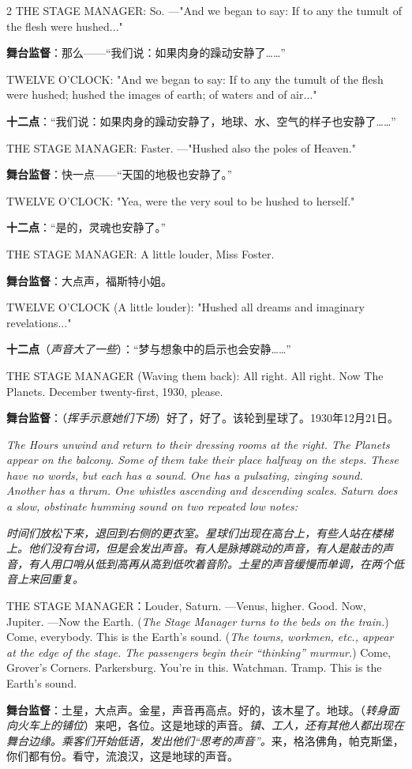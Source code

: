 \documentclass[lang=cn,newtx,10pt,scheme=chinese]{elegantbook}
\newcommand{\pair}[2]{%
\switchcolumn* #2\par
\switchcolumn  #1\par
}
\begin{document}
\begin{paracol}{2}
\pair{
    \textbf{舞台监督}：那么——“我们说：如果肉身的躁动安静了……”
}{
    THE STAGE MANAGER: So. —"And we began to say: If to any the tumult of the flesh were hushed..."
}

\pair{
    \textbf{十二点}：“我们说：如果肉身的躁动安静了，地球、水、空气的样子也安静了……”
}{
    TWELVE O'CLOCK: "And we began to say: If to any the tumult of the flesh were hushed; hushed the images of earth; of waters and of air..."
}

\pair{
    \textbf{舞台监督}：快一点——“天国的地极也安静了。”
}{
    THE STAGE MANAGER: Faster. —"Hushed also the poles of Heaven."
}

\pair{
    \textbf{十二点}：“是的，灵魂也安静了。”
}{
    TWELVE O'CLOCK: "Yea, were the very soul to be hushed to herself."
}

\pair{
    \textbf{舞台监督}：大点声，福斯特小姐。
}{
    THE STAGE MANAGER: A little louder, Miss Foster.
}

\pair{
    \textbf{十二点}（\textit{声音大了一些}）：“梦与想象中的启示也会安静……”
}{
    TWELVE O'CLOCK (A little louder): "Hushed all dreams and imaginary revelations..."
}

\pair{
    \textbf{舞台监督}：（\textit{挥手示意她们下场}）好了，好了。该轮到星球了。1930年12月21日。
}{
    THE STAGE MANAGER (Waving them back): All right. All right. Now The Planets. December twenty-first, 1930, please.
    \newline
    \newline
}

\pair{
    \textit{时间们放松下来，退回到右侧的更衣室。星球们出现在高台上，有些人站在楼梯上。他们没有台词，但是会发出声音。有人是脉搏跳动的声音，有人是敲击的声音，有人用口哨从低到高再从高到低吹着音阶。土星的声音缓慢而单调，在两个低音上来回重复。}
}{
    \textit{The Hours unwind and return to their dressing rooms at the right. The Planets appear on the balcony. Some of them take their place halfway on the steps. These have no words, but each has a sound. One has a pulsating, zinging sound. Another has a thrum. One whistles ascending and descending scales. Saturn does a slow, obstinate humming sound on two repeated low notes:}
    \newline
    \newline
}

\pair{
    \textbf{舞台监督}：土星，大点声。金星，声音再高点。好的，该木星了。地球。（\textit{转身面向火车上的铺位}）来吧，各位。这是地球的声音。\textit{镇、工人，还有其他人都出现在舞台边缘。乘客们开始低语，发出他们“思考的声音”。}来，格洛佛角，帕克斯堡，你们都有份。看守，流浪汉，这是地球的声音。
}{
    THE STAGE MANAGER：Louder, Saturn. —Venus, higher. Good. Now, Jupiter. —Now the Earth. (\textit{The Stage Manager turns to the beds on the train.}) Come, everybody. This is the Earth's sound. (\textit{The towns, workmen, etc., appear at the edge of the stage. The passengers begin their “thinking” murmur.}) Come, Grover's Corners. Parkersburg. You're in this. Watchman. Tramp. This is the Earth’s sound.
    \newline
}


\end{paracol}
\end{document}
